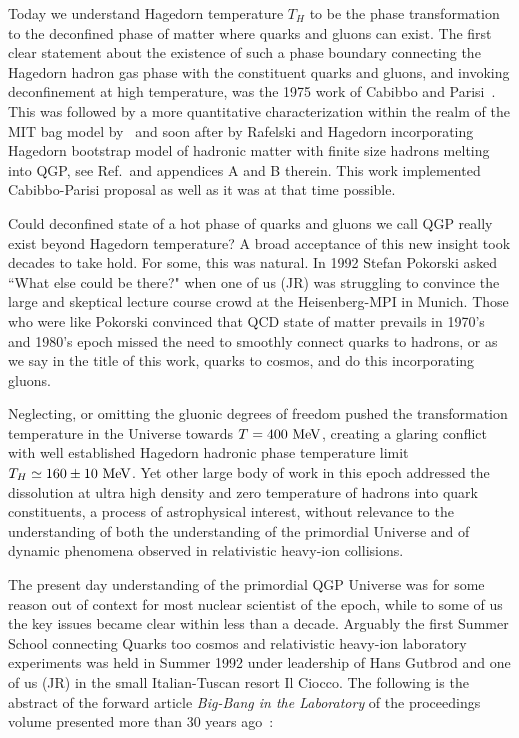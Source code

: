 Today we understand Hagedorn temperature $T_H$ to be the phase transformation to the deconfined phase of matter where quarks and gluons can exist. The first clear statement about the existence of such a phase boundary connecting the Hagedorn hadron gas phase with the constituent quarks and gluons, and invoking deconfinement at high temperature, was the 1975 work of Cabibbo and Parisi~\cite{Cabibbo:1975ig}. This was followed by a more quantitative characterization within the realm of the MIT bag model by~\cite{Chin:1978gj} and soon after by Rafelski and Hagedorn incorporating Hagedorn bootstrap model of hadronic matter with finite size hadrons melting into QGP, see Ref.\,\cite{Rafelski:2015cxa} and appendices A and B therein. This work implemented Cabibbo-Parisi proposal as well as it was at that time possible.

Could deconfined state of a hot phase of quarks and gluons we call QGP really exist beyond Hagedorn temperature? A broad acceptance of this new insight took decades to take hold. For some, this was natural. In 1992 Stefan Pokorski asked ``What else could be there?" when one of us (JR) was struggling to convince the large and skeptical lecture course crowd at the Heisenberg-MPI in Munich. Those who were like Pokorski convinced that QCD state of matter prevails in 1970's and 1980's epoch missed the need to smoothly connect quarks to hadrons, or as we say in the title of this work, quarks to cosmos, and do this incorporating gluons. 

Neglecting, or omitting the gluonic degrees of freedom pushed the transformation temperature in the Universe towards $T=400\text{ MeV}$, creating a glaring conflict with well established Hagedorn hadronic phase temperature limit $T_H\simeq 160\pm 10\text{ MeV}$. Yet other large body of work in this epoch addressed the dissolution at ultra high density and zero temperature of hadrons into quark constituents, a process of astrophysical interest, without relevance to the understanding of both the understanding of the primordial Universe and of dynamic phenomena observed in relativistic heavy-ion collisions.

The present day understanding of the primordial QGP Universe was for some reason out of context for most nuclear scientist of the epoch, while to some of us the key issues became clear within less than a decade. Arguably the first Summer School connecting Quarks too cosmos and relativistic heavy-ion laboratory experiments was held in Summer 1992 under leadership of Hans Gutbrod and one of us (JR) in the small Italian-Tuscan resort Il Ciocco. The following is the abstract of the forward article {\it Big-Bang in the Laboratory} of the proceedings volume presented more than 30 years ago~\cite{Gutbrod1993}: 

